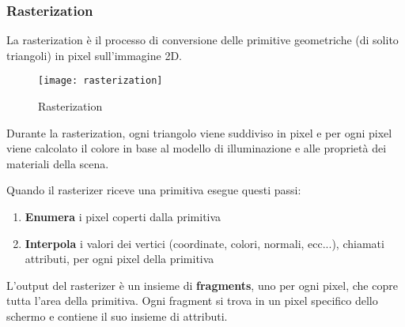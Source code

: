 \documentclass[a4paper]{article}
\begin{document}
\subsubsection{Rasterization}
La rasterization è il processo di conversione delle primitive geometriche (di solito
triangoli) in pixel sull'immagine 2D.
\begin{figure}[H]
  \centering
  \texttt{[image: rasterization]}
  \caption{Rasterization}
\end{figure}
\noindent
Durante la rasterization, ogni triangolo viene suddiviso in pixel e per ogni pixel
viene calcolato il colore in base al modello di illuminazione e alle proprietà dei materiali
della scena.

\vspace{1em}
\noindent
Quando il rasterizer riceve una primitiva esegue questi passi:
\begin{enumerate}
  \item \textbf{Enumera} i pixel coperti dalla primitiva
  \item \textbf{Interpola} i valori dei vertici (coordinate, colori, normali, ecc...),
    chiamati attributi, per ogni pixel della primitiva
\end{enumerate}
L'output del rasterizer è un insieme di \textbf{fragments}, uno per ogni pixel, che
copre tutta l'area della primitiva. Ogni fragment si trova in un pixel specifico dello
schermo e contiene il suo insieme di attributi.
\end{document}
